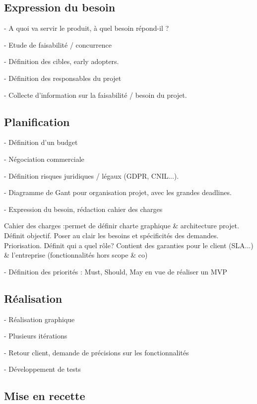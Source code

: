 
\subsection{Expression du besoin}

- A quoi va servir le produit, à quel besoin répond-il ?

- Etude de faisabilité / concurrence

- Définition des cibles, early adopters.

- Définition des responsables du projet

- Collecte d'information sur la faisabilité / besoin du projet.


\subsection{Planification}

- Définition d'un budget

- Négociation commerciale

- Définition risques juridiques / légaux (GDPR, CNIL...).

- Diagramme de Gant pour organisation projet, avec les grandes deadlines.

- Expression du besoin, rédaction cahier des charges

Cahier des charges :permet de définir charte graphique \& architecture projet. Définit objectif. Poser au clair les besoins et spécificités des demandes. Priorisation. Définit qui a quel rôle? Contient des garanties pour le client (SLA...) \& l'entreprise (fonctionnalités hors scope \& co)

- Définition des priorités : Must, Should, May en vue de réaliser un MVP


\subsection{Réalisation}

- Réalisation graphique

- Plusieurs itérations

- Retour client, demande de précisions sur les fonctionnalités

- Développement de tests


\subsection{Mise en recette}

